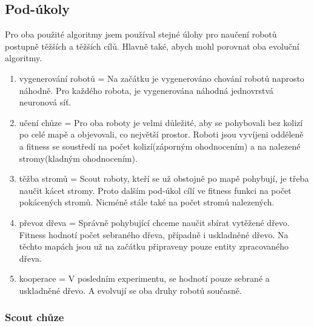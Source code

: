 \subsection{Pod-úkoly} 
Pro oba použité algoritmy jsem používal stejné úlohy pro naučení robotů postupně těžších a těžších cílů. Hlavně také, abych mohl porovnat oba evoluční algoritmy.  
\begin{enumerate}
        \item vygenerování robotů = Na začátku je vygenerováno chování robotů naprosto náhodně. Pro každého robota, je vygenerována náhodná jednovrstvá neuronová síť. 
        \item učení chůze = Pro oba roboty je velmi důležité, aby se pohybovali bez kolizí po celé mapě a objevovali, co největší prostor. Roboti jsou vyvíjeni odděleně a fitness se soustředí na počet kolizí(záporným ohodnocením) a na nalezené stromy(kladným ohodnocením).
        \item těžba stromů = Scout roboty, kteří se už obstojně po mapě pohybují, je třeba naučit kácet stromy. Proto dalším pod-úkol cílí ve fitness funkci na počet pokácených stromů. Nicméně stále také na počet stromů nalezených. 
        \item převoz dřeva = Správně pohybující chceme naučit sbírat vytěžené dřevo. Fitness hodnotí počet sebraného dřeva, případně i uskladněné dřevo. Na těchto mapách jsou už na začátku připraveny pouze entity zpracovaného dřeva.
        \item kooperace = V posledním experimentu, se hodnotí pouze sebrané a uskladněné dřevo. A evolvují se oba druhy robotů současně. 
\end{enumerate}
\subsubsection{Scout chůze}
